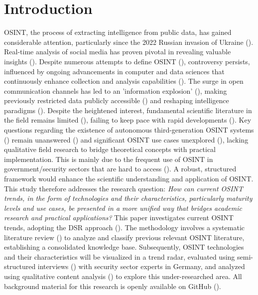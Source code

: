 \documentclass[10pt]{article}
\begin{document}
\section{Introduction} \label{sec:introduction}

OSINT, the process of extracting intelligence from public data, has gained considerable attention, particularly since
the 2022 Russian invasion of Ukraine (\cite{DosPassos.2017}). Real-time analysis of social media has proven pivotal in revealing
valuable insights (\cite{SmithBoyle.24.07.2023}). Despite numerous attempts to define OSINT
(\cite{PastorGalindo.2020, Yogish.2021}), controversy persists, influenced by ongoing advancements in computer and
data sciences that continuously enhance collection and analysis capabilities (\cite{Ghioni.2023, Williams.2018}).
The surge in open communication channels has led to an 'information explosion' (\cite{Hwang.2022, Yogish.2021}),
making previously restricted data publicly accessible (\cite{Williams.2018}) and reshaping intelligence paradigms (\cite{Dokman.2020}).
Despite the heightened interest, fundamental scientific literature in the field remains limited (\cite{HerreraCubides.2020}),
failing to keep pace with rapid developments (\cite{Ghioni.2023, Williams.2018}). Key questions regarding the existence of
autonomous third-generation OSINT systems (\cite{PastorGalindo.2019, PastorGalindo.2020}) remain unanswered
(\cite{Ghioni.2023, PastorGalindo.2020, Yogish.2021}) and significant OSINT use cases unexplored
(\cite{AlKilani.2021, Dokman.2020, Ghioni.2023}), lacking qualitative field research to bridge theoretical concepts with
practical implementation. This is mainly due to the frequent use of OSINT in government/security sectors that are hard to access (\cite{HerreraCubides.2020, PastorGalindo.2019}). A robust, structured framework would enhance the scientific understanding and application of OSINT. This study therefore addresses the research question:
\textit{How can current OSINT trends, in the form of technologies and their characteristics, particularly maturity levels and use cases, be presented in a more unified way that bridges academic research and practical applications?}
This paper investigates current OSINT trends, adopting the DSR approach (\cite{Peffers.2007}).
The methodology involves a systematic literature review (\cite{Cleven.2009}) to analyze and classify previous relevant OSINT literature, establishing a consolidated knowledge base.
Subsequently, OSINT technologies and their characteristics will be visualized in a trend radar, evaluated using semi-structured
interviews (\cite{Glaser.2009}) with security sector experts in Germany, and analyzed using qualitative content analysis (\cite{Billings.1997}) to explore this under-researched area. All background material for this research is openly available on GitHub (\cite{kayser2024}).
\end{document}
